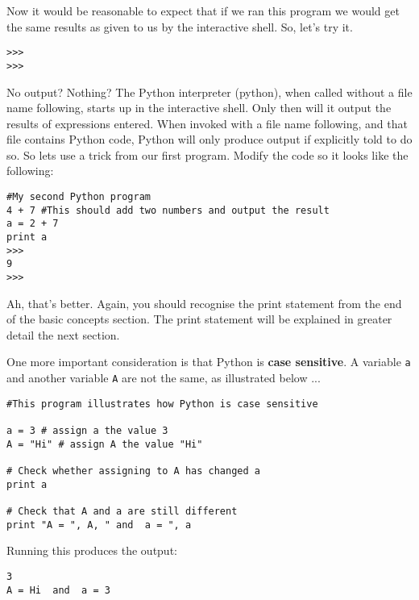 Now it would be reasonable to expect that if we ran this program we   would get the same results as given to us by the interactive shell. So,   let's try it.     
\begin{lstlisting}
>>>
>>>
\end{lstlisting}

No output? Nothing? The Python interpreter (python), when called   without a file name following, starts up in the interactive shell. Only   then will it output the results of expressions entered. When invoked   with a file name following, and that file contains Python code, Python   will only produce output if explicitly told to do so. So lets use a trick    from our first program. Modify the code so it looks like the following:
\begin{lstlisting}
#My second Python program
4 + 7 #This should add two numbers and output the result
a = 2 + 7
print a
>>>
9
>>>
\end{lstlisting}

Ah, that's better. Again, you should recognise the print statement   from the end of the basic concepts section. The print statement will be   explained in greater detail the next section.

One more important consideration is that Python is \textbf{case   sensitive}. A variable \texttt{a} and another variable \texttt{A} are not the   same, as illustrated below ...
\begin{lstlisting}
#This program illustrates how Python is case sensitive

a = 3 # assign a the value 3
A = "Hi" # assign A the value "Hi"

# Check whether assigning to A has changed a
print a

# Check that A and a are still different
print "A = ", A, " and  a = ", a
\end{lstlisting}

Running this produces the output:
\begin{lstlisting}
3
A = Hi  and  a = 3
\end{lstlisting}

